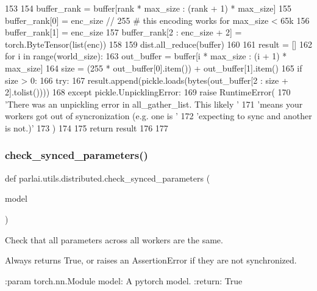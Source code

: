 \begin{DoxyCode}
153 
154     buffer\_rank = buffer[rank * max\_size : (rank + 1) * max\_size]
155     buffer\_rank[0] = enc\_size // 255  \textcolor{comment}{# this encoding works for max\_size < 65k}
156     buffer\_rank[1] = enc\_size %
157     buffer\_rank[2 : enc\_size + 2] = torch.ByteTensor(list(enc))
158 
159     dist.all\_reduce(buffer)
160 
161     result = []
162     \textcolor{keywordflow}{for} i \textcolor{keywordflow}{in} range(world\_size):
163         out\_buffer = buffer[i * max\_size : (i + 1) * max\_size]
164         size = (255 * out\_buffer[0].item()) + out\_buffer[1].item()
165         \textcolor{keywordflow}{if} size > 0:
166             \textcolor{keywordflow}{try}:
167                 result.append(pickle.loads(bytes(out\_buffer[2 : size + 2].tolist())))
168             \textcolor{keywordflow}{except} pickle.UnpicklingError:
169                 \textcolor{keywordflow}{raise} RuntimeError(
170                     \textcolor{stringliteral}{'There was an unpickling error in all\_gather\_list. This likely '}
171                     \textcolor{stringliteral}{'means your workers got out of syncronization (e.g. one is '}
172                     \textcolor{stringliteral}{'expecting to sync and another is not.)'}
173                 )
174 
175     \textcolor{keywordflow}{return} result
176 
177 
\end{DoxyCode}
\mbox{\label{namespaceparlai_1_1utils_1_1distributed_afc64140f9a6437dc1a2b2bd4294ba8ef}} 
\subsubsection{\texorpdfstring{check\+\_\+synced\+\_\+parameters()}{check\_synced\_parameters()}}
{\footnotesize\ttfamily def parlai.\+utils.\+distributed.\+check\+\_\+synced\+\_\+parameters (\begin{DoxyParamCaption}\item[{}]{model }\end{DoxyParamCaption})}

\begin{DoxyVerb}Check that all parameters across all workers are the same.

Always returns True, or raises an AssertionError if they are not
synchronized.

:param torch.nn.Module model: A pytorch model.
:return: True
\end{DoxyVerb}
 

